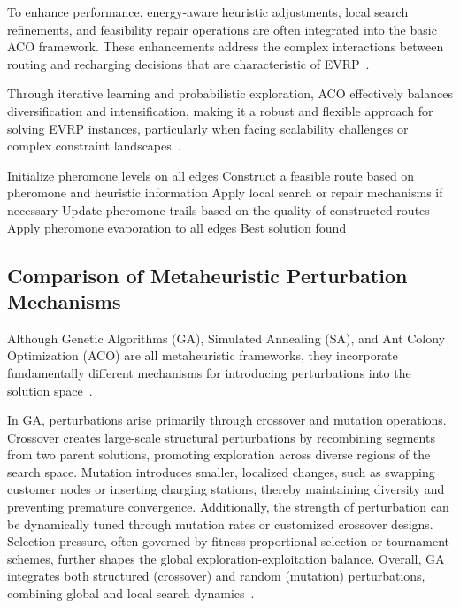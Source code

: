 To enhance performance, energy-aware heuristic adjustments, local search refinements, and feasibility repair operations are often integrated into the basic ACO framework. These enhancements address the complex interactions between routing and recharging decisions that are characteristic of EVRP~\cite{meng2020route}.

Through iterative learning and probabilistic exploration, ACO effectively balances diversification and intensification, making it a robust and flexible approach for solving EVRP instances, particularly when facing scalability challenges or complex constraint landscapes~\cite{zhao2020distribution,zhao2020distribution}.

\begin{algorithm}[H]
\caption{Ant Colony Optimization for EVRP}
\begin{algorithmic}[1]
\State Initialize pheromone levels on all edges
        \State Construct a feasible route based on pheromone and heuristic information
    \EndFor
    \State Apply local search or repair mechanisms if necessary
    \State Update pheromone trails based on the quality of constructed routes
    \State Apply pheromone evaporation to all edges
\EndWhile
\State \Return Best solution found
\end{algorithmic}
\end{algorithm}

\subsection{Comparison of Metaheuristic Perturbation Mechanisms}

Although Genetic Algorithms (GA), Simulated Annealing (SA), and Ant Colony Optimization (ACO) are all metaheuristic frameworks, they incorporate fundamentally different mechanisms for introducing perturbations into the solution space~\cite{kumbharana2013comparative}.

In GA, perturbations arise primarily through crossover and mutation operations. Crossover creates large-scale structural perturbations by recombining segments from two parent solutions, promoting exploration across diverse regions of the search space. Mutation introduces smaller, localized changes, such as swapping customer nodes or inserting charging stations, thereby maintaining diversity and preventing premature convergence. Additionally, the strength of perturbation can be dynamically tuned through mutation rates or customized crossover designs. Selection pressure, often governed by fitness-proportional selection or tournament schemes, further shapes the global exploration-exploitation balance. Overall, GA integrates both structured (crossover) and random (mutation) perturbations, combining global and local search dynamics~\cite{ansari2015comparison}.

